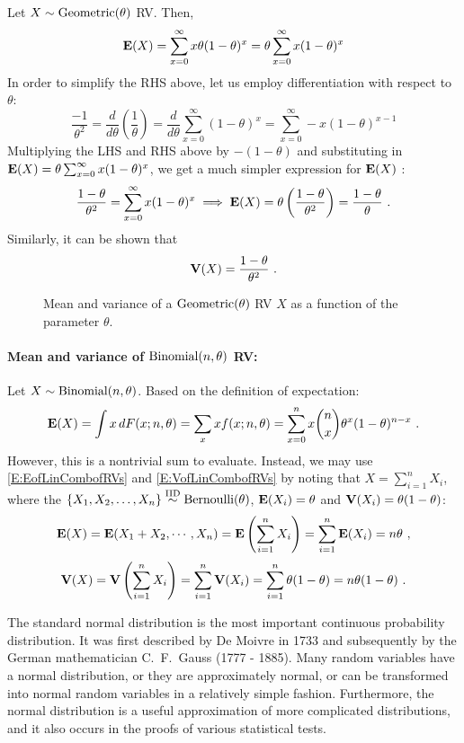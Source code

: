 \begin{example}
Let $X \sim \mbox{{\rm Geometric}}(\theta)$ RV.  Then,
\[
\mathbf{E}(X) = \sum_{x=0}^{\infty} x \theta(1-\theta)^x =  \theta \sum_{x=0}^{\infty} x (1-\theta)^x
\]
In order to simplify the RHS above, let us employ differentiation with respect to $\theta$:
\[
\frac{-1}{\theta^2}= \frac{d}{d\theta} \left( \frac{1}{\theta} \right)= \frac{d}{d\theta} \sum_{x=0}^{\infty} (1-\theta)^x  =  \sum_{x=0}^{\infty} -x (1-\theta)^{x-1}
\]
Multiplying the LHS and RHS above by $-(1-\theta)$ and substituting in $\mathbf{E}(X)=  \theta \sum_{x=0}^{\infty} x (1-\theta)^x$, we get a much simpler expression for $\mathbf{E}(X)$ :
\[
\frac{1-\theta}{\theta^2}= \sum_{x=0}^{\infty} x (1-\theta)^{x} \implies \mathbf{E}(X) = \theta \left( \frac{1-\theta}{\theta^2} \right) = \frac{1-\theta}{\theta} \ .
\]
Similarly, it can be shown that
\[
\mathbf{V}(X) = \frac{1-\theta}{\theta^2} \ .
\]

\begin{figure}[htpb]
\caption{Mean and variance of a $\mbox{{\rm Geometric}}(\theta)$ RV $X$ as a function of the parameter $\theta$.\label{F:MeanVarGeom}}
\centering   {}
\end{figure}
\end{example}

\paragraph{Mean and variance of $\mbox{{\rm Binomial}}(n,\theta)$ RV:}
Let $X \sim \mbox{{\rm Binomial}}(n,\theta)$.  Based on the definition of expectation:
\[
\e(X) = \int x \, dF(x; n,\theta) = \sum_x x f(x;n,\theta) = \sum_{x =0}^n x \binom{n}{x} \theta^x (1-\theta)^{n-x} \ .
\]
However, this is a nontrivial sum to evaluate.  Instead, we may use \eqref{E:EofLinCombofRVs} and \eqref{E:VofLinCombofRVs} by noting that $X = \sum_{i=1}^n X_i$, where the $\{X_1,X_2,\ldots,X_n \} \overset{{\rm IID}}{\sim} \mbox{{\rm Bernoulli}}(\theta)$, $\mathbf{E}(X_i) = \theta$ and $\mathbf{V}(X_i)=\theta(1-\theta)$:
\[
\mathbf{E}(X) = \mathbf{E}(X_1+X_2, \cdots ,X_n) = \mathbf{E} \left( \sum_{i=1}^n X_i \right) = \sum_{i=1}^n \mathbf{E}(X_i) = n \theta \ ,
\]
\[
\mathbf{V}(X) = \mathbf{V} \left( \sum_{i=1}^n X_i \right) = \sum_{i=1}^n \mathbf{V}(X_i) = \sum_{i=1}^n{\theta(1-\theta)} = n\theta(1-\theta) \ .
\]

The standard normal distribution is the most important continuous
probability distribution. It was first described by De Moivre in 1733
and subsequently by the German mathematician C.~F.~Gauss (1777 - 1885).
Many  random variables  have a normal distribution, or they are
approximately normal, or can be transformed into normal random variables
in a relatively simple fashion. Furthermore, the normal distribution is
a useful approximation of more complicated distributions, and it also
occurs in the proofs of various statistical tests.

